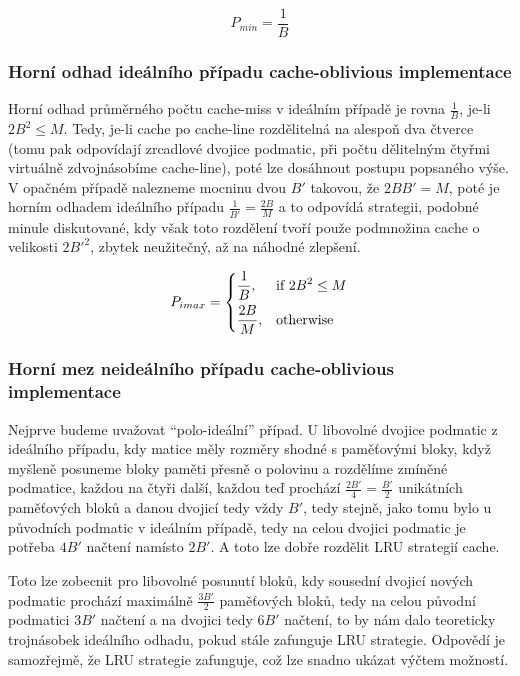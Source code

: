\documentclass[a4paper,12pt]{article} %
\begin{document}
\[P_{min} = \frac{1}{B}\]

\subsubsection{Horní odhad ideálního případu cache-oblivious implementace}

Horní odhad průměrného počtu cache-miss v ideálním případě je rovna $\frac{1}{B}$, je-li $2 B^2 \leq M$. Tedy, je-li cache po cache-line rozdělitelná na alespoň dva čtverce (tomu pak odpovídají zrcadlové dvojice podmatic, při počtu dělitelným čtyřmi virtuálně zdvojnásobíme cache-line), poté lze dosáhnout postupu popsaného výše. V opačném případě nalezneme mocninu dvou $B'$ takovou, že $2 B B' = M$, poté je horním odhadem ideálního případu $\frac{1}{B'} = \frac{2B}{M}$ a to odpovídá strategii, podobné minule diskutované, kdy však toto rozdělení tvoří použe podmnožina cache o velikosti $2 B'^2$, zbytek neužitečný, až na náhodné zlepšení.

\[P_{imax} = \begin{dcases}
	\frac{1}{B}, & \text{if } 2 B^2 \leq M\\
	\frac{2B}{M}, & \text{otherwise}
\end{dcases}
\]

\subsubsection{Horní mez neideálního případu cache-oblivious implementace}

Nejprve budeme uvažovat ``polo-ideální'' případ. U libovolné dvojice podmatic z ideálního případu, kdy matice měly rozměry shodné s paměťovými bloky, když myšleně posuneme bloky paměti přesně o polovinu a rozdělíme zmíněné podmatice, každou na čtyři další, každou teď prochází $\frac{2B'}{4} = \frac{B'}{2}$ unikátních paměťových bloků a danou dvojicí tedy vždy $B'$, tedy stejně, jako tomu bylo u původních podmatic v ideálním případě, tedy na celou dvojici podmatic je potřeba $4B'$ načtení namísto $2B'$. A toto lze dobře rozdělit LRU strategií cache.

Toto lze zobecnit pro libovolné posunutí bloků, kdy sousední dvojicí nových podmatic prochází maximálně $\frac{3B'}{2}$ paměťových bloků, tedy na celou původní podmatici $3B'$ načtení a na dvojici tedy $6B'$ načtení, to by nám dalo teoreticky trojnásobek ideálního odhadu, pokud stále zafunguje LRU strategie. Odpovědí je samozřejmě, že LRU strategie zafunguje, což lze snadno ukázat výčtem možností.
\end{document}
